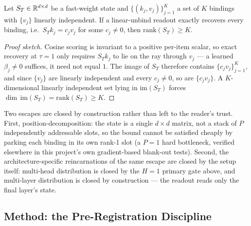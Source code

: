 \begin{proposition}
\label{prop:rank-necessity}
Let $S_T\in\mathbb{R}^{d\times d}$ be a fast-weight state and
$\{(k_j,v_j)\}_{j=1}^{K}$ a set of $K$ bindings with $\{v_j\}$ linearly
independent. If a linear-unbind readout exactly recovers every binding,
i.e.\ $S_T k_j = c_j v_j$ for some $c_j\neq0$, then $\mathrm{rank}(S_T)
\geq K$.
\end{proposition}

\begin{proof}[Proof sketch]
Cosine scoring is invariant to a positive per-item scalar, so exact
recovery at $\tau{=}1$ only requires $S_T k_j$ to lie on the ray through
$v_j$ --- a learned $\beta_j\neq0$ suffices, it need not equal $1$. The
image of $S_T$ therefore contains $\{c_jv_j\}_{j=1}^K$, and since
$\{v_j\}$ are linearly independent and every $c_j\neq0$, so are
$\{c_jv_j\}$. A $K$-dimensional linearly independent set lying in
$\mathrm{im}(S_T)$ forces $\dim\,\mathrm{im}(S_T) = \mathrm{rank}(S_T)
\geq K$.
\end{proof}

Two escapes are closed by construction rather than left to the reader's
trust. First, position-decomposition: the state is a single $d\times d$
matrix, not a stack of $P$ independently addressable slots, so the bound
cannot be satisfied cheaply by parking each binding in its own rank-1
slot (a $P{=}1$ hard bottleneck, verified elsewhere in this project's
own gradient-based blank-out tests). Second, the architecture-specific
reincarnations of the same escape are closed by the setup itself:
multi-head distribution is closed by the $H{=}1$ primary gate above, and
multi-layer distribution is closed by construction --- the readout reads
only the final layer's state.

\subsection{Method: the Pre-Registration Discipline}

